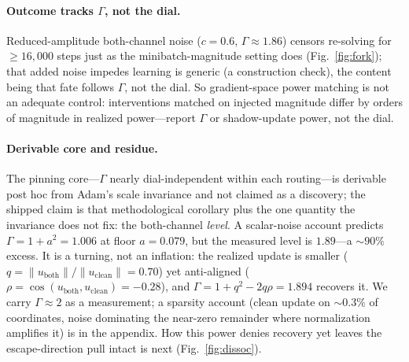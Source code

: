 \paragraph{Outcome tracks $\Gamma$, not the dial.}
Reduced-amplitude both-channel noise ($c=0.6$, $\Gamma\!\approx\!1.86$) censors
re-solving for $\ge\!16{,}000$ steps just as the minibatch-magnitude setting does
(Fig.~\ref{fig:fork}); that added noise impedes learning is generic (a
construction check), the content being that fate follows $\Gamma$, not the dial.
So gradient-space power matching is not an adequate control: interventions matched
on injected magnitude differ by orders of magnitude in realized power---report
$\Gamma$ or shadow-update power, not the dial.

\paragraph{Derivable core and residue.}
The pinning core---$\Gamma$ nearly dial-independent within each routing---is
derivable post hoc from Adam's scale invariance \citep{adam} and not claimed as a
discovery; the shipped claim is that methodological corollary plus the one
quantity the invariance does not fix: the both-channel \emph{level}. A
scalar-noise account predicts $\Gamma=1+a^2=1.006$ at floor $a=0.079$, but the
measured level is $1.89$---a $\sim\!90\%$ excess. It is a turning, not an
inflation: the realized update is smaller
($q=\lVert u_{\mathrm{both}}\rVert/\lVert u_{\mathrm{clean}}\rVert=0.70$) yet
anti-aligned ($\rho=\cos(u_{\mathrm{both}},u_{\mathrm{clean}})=-0.28$), and
$\Gamma=1+q^2-2q\rho=1.894$ recovers it. We carry $\Gamma\!\approx\!2$ as a
measurement; a sparsity account (clean update on $\sim\!0.3\%$ of coordinates,
noise dominating the near-zero remainder where normalization amplifies it) is in
the appendix. How this power denies recovery yet leaves the escape-direction pull
intact is next (Fig.~\ref{fig:dissoc}).